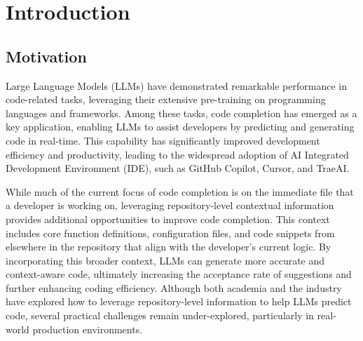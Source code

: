 \chapter{Introduction}

\section{Motivation}

Large Language Models (LLMs) have demonstrated remarkable performance in code-related tasks, leveraging their extensive pre-training on programming languages and frameworks. Among these tasks, code completion has emerged as a key application, enabling LLMs to assist developers by predicting and generating code in real-time. This capability has significantly improved development efficiency and productivity, leading to the widespread adoption of AI Integrated Development Environment (IDE), such as GitHub Copilot, Cursor, and TraeAI.

While much of the current focus of code completion is on the immediate file that a developer is working on, leveraging repository-level contextual information provides additional opportunities to improve code completion. This context includes  core function definitions, configuration files, and code snippets from elsewhere in the repository that align with the developer’s current logic. By incorporating this broader context, LLMs can generate more accurate and context-aware code, ultimately increasing the acceptance rate of suggestions and further enhancing coding efficiency. Although both academia and the industry have explored how to leverage repository-level information to help LLMs predict code, several practical challenges remain under-explored, particularly in real-world production environments.



